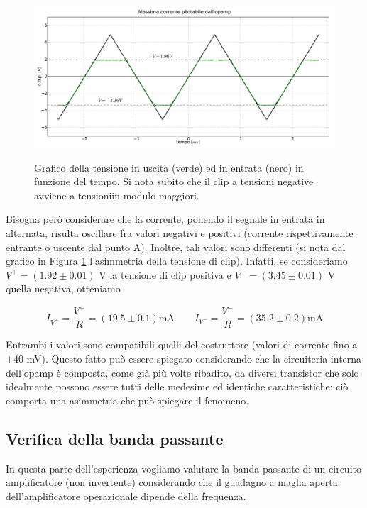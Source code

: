 \begin{figure}[ht]
 \centering
   {\includegraphics[width=\textwidth]{../E03/latex/clip.pdf}}
 \caption{Grafico della tensione in uscita (verde) ed in entrata (nero) in funzione del tempo. Si nota subito che il clip a tensioni negative avviene a tensioniin modulo maggiori.}
 \label{gr3:clip}
\end{figure}

Bisogna però considerare che la corrente, ponendo il segnale in entrata in alternata, risulta oscillare fra valori negativi e positivi (corrente rispettivamente entrante o uscente dal punto A). Inoltre, tali valori sono differenti (si nota dal grafico in Figura \ref{gr3:clip} l'asimmetria della tensione di clip). Infatti, se consideriamo $V^+ = (1.92 \pm 0.01)$ \si{\volt} la tensione di clip positiva e $V^- = (3.45 \pm 0.01)$ \si{\volt} quella negativa, otteniamo

$$I_{V^+} = \frac{V^+}{R} = (19.5 \pm 0.1) \si{\milli\ampere}  \qquad I_{V^-} = \frac{V^-}{R} = (35.2 \pm 0.2) \si{\milli\ampere}$$

Entrambi i valori sono compatibili quelli del costruttore (valori di corrente fino a $\pm 40$ \si{\milli\volt}). Questo fatto può essere spiegato considerando che la circuiteria interna dell'opamp è composta, come già più volte ribadito, da diversi transistor che solo idealmente possono essere tutti delle medesime ed identiche caratteristiche: ciò comporta una asimmetria che può spiegare il fenomeno.

\subsection{Verifica della banda passante}
\label{par3:bode}

In questa parte dell'esperienza vogliamo valutare la banda passante di un circuito amplificatore (non invertente) considerando che il guadagno a maglia aperta dell'amplificatore operazionale dipende della frequenza.


